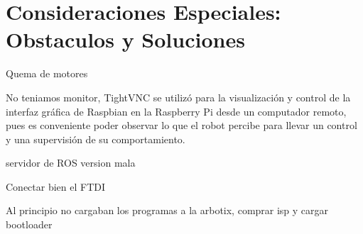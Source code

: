 \chapter{Consideraciones Especiales: Obstaculos y Soluciones} \label{chapter:consideraciones}

Quema de motores 

No teniamos monitor, TightVNC se utilizó para la visualización y control de la interfaz gráfica de Raspbian en la Raspberry Pi desde un computador remoto, pues es conveniente poder observar lo que el robot percibe para llevar un control y una supervisión de su comportamiento.

servidor de ROS version mala

Conectar bien el FTDI

Al principio no cargaban los programas a la arbotix, comprar isp y cargar bootloader

